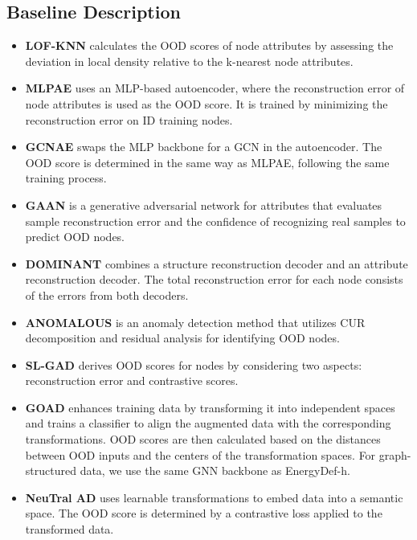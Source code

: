 \subsection{Baseline Description}\label{subsec-apdix-Baseline}
\begin{itemize}[nosep, topsep=0pt, leftmargin=*]
    \item \textbf{LOF-KNN} \citep{breunig2000lof} calculates the OOD scores of node attributes by assessing the deviation in local density relative to the k-nearest node attributes.
    \item \textbf{MLPAE} uses an MLP-based autoencoder, where the reconstruction error of node attributes is used as the OOD score. It is trained by minimizing the reconstruction error on ID training nodes.
    \item \textbf{GCNAE} \citep{kipf2016variational} swaps the MLP backbone for a GCN in the autoencoder. The OOD score is determined in the same way as MLPAE, following the same training process.
    \item \textbf{GAAN} \citep{chen2020generative} is a generative adversarial network for attributes that evaluates sample reconstruction error and the confidence of recognizing real samples to predict OOD nodes.
    \item \textbf{DOMINANT} \citep{ding2019deep} combines a structure reconstruction decoder and an attribute reconstruction decoder. The total reconstruction error for each node consists of the errors from both decoders.
    \item \textbf{ANOMALOUS} \citep{peng2018anomalous} is an anomaly detection method that utilizes CUR decomposition and residual analysis for identifying OOD nodes.
    \item \textbf{SL-GAD} \citep{zheng2021generative} derives OOD scores for nodes by considering two aspects: reconstruction error and contrastive scores.
    \item \textbf{GOAD} \citep{bergman2020classification} enhances training data by transforming it into independent spaces and trains a classifier to align the augmented data with the corresponding transformations. OOD scores are then calculated based on the distances between OOD inputs and the centers of the transformation spaces. For graph-structured data, we use the same GNN backbone as EnergyDef-h.
    \item \textbf{NeuTral AD} \citep{qiu2021neural} uses learnable transformations to embed data into a semantic space. The OOD score is determined by a contrastive loss applied to the transformed data.

\end{itemize}
